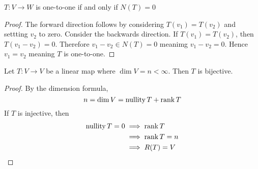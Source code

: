 \documentclass[../notes.tex]{subfiles}
\begin{document}
\begin{theorem}
    $T : V \to W$ is one-to-one if and only if $N(T) = \qty{0}$
\end{theorem}

\begin{proof}
    The forward direction follows by considering $T(v_1) = T(v_2)$ and settting $v_2$ to zero. Consider the backwards direction. If $T(v_1) = T(v_2)$, then $T(v_1 - v_2) = 0$. Therefore $v_1 - v_2 \in N(T) = \qty{0}$ meanimg $v_1 - v_2 = 0$. Hence $v_1 = v_2$ meaning $T$ is one-to-one.
\end{proof}

\begin{theorem}
    Let $T: V \to V$ be a linear map where $\dim V = n < \infty$. Then $T$ is bijective.
\end{theorem}
\begin{proof}
    By the dimension formula,
    \[
        n = \dim V = \operatorname{nullity} T + \rank T
    \]
    If $T$ is injective, then 
    \begin{align*}
        \operatorname{nullity} T = 0 &\implies \rank T \\
                                     &\implies \rank T = n \\
                                     &\implies R(T) = V
    \end{align*}
\end{proof}
\end{document}
